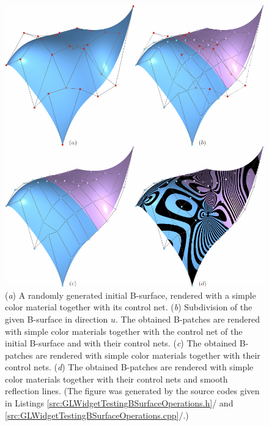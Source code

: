 \documentclass[b5paper, twosided]{book}
\DeclareRobustCommand{\mref}[1]{\ref{#1}{\relsize{-1}/\pageref{#1}}}
\begin{document}
\begin{figure}[!htb]
    \centering
    \includegraphics[]{images/B_surface_subdivision_u.pdf}
    \caption{(\textit{a}) A randomly generated initial B-surface, rendered with a simple color material together with its control net. (\textit{b}) Subdivision of the given B-surface in direction $u$. The obtained B-patches are rendered with simple color materials together with the control net of the initial B-surface and with their control nets. (\textit{c}) The obtained B-patches are rendered with simple color materials together with their control nets. (\textit{d}) The obtained B-patches are rendered with simple color materials together with their control nets and smooth reflection lines. (The figure was generated by the source codes given in Listings \mref{src:GLWidgetTestingBSurfaceOperations.h} and \mref{src:GLWidgetTestingBSurfaceOperations.cpp}.)}
    \label{fig:B_surface_subdivision_u}
\end{figure}
\end{document}
